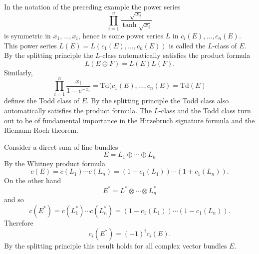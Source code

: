 \begin{example}\label{L-class and Todd class}
In the notation of the preceding example the power series
\[\prod_{i=1}^{n}\frac{\sqrt{x_i}}{\tanh\sqrt{x_i}}\]
is symmetric in $x_1,\dots,x_i$, hence is some power series $L$ in $c_i(E),\dots,c_n(E)$. This power series $L(E)=L(c_1(E),\dots,c_n(E))$ is called the $L$-class of $E$. 
By the splitting principle the $L$-class automatically satisfies the product formula
\[L(E\oplus F)=L(E)L(F).\]
Similarly,
\[\prod_{i=1}^{n}\frac{x_i}{1-e^{-x_i}}=\mathrm{Td}(c_1(E),\dots,c_n(E)=\mathrm{Td}(E)\]
defines the Todd class of $E$. By the splitting principle the Todd class also automatically satisfies the product formula. The $L$-class and the Todd class turn out to 
be of fundamental importance in the Hirzebruch signature formula and the Riemann-Roch theorem.
\end{example}
\begin{example}\label{Chern dual bundle}
Consider a direct sum of line bundles
\[E=L_1\oplus\cdots\oplus L_n\]
By the Whitney product formula
\[c(E)=c(L_1)\cdots c(L_n)=(1+c_1(L_1))\cdots(1+c_1(L_n)).\]
On the other hand
\[E^*=L^*\otimes\cdots\otimes L_n^*\]
and so
\[c(E^*)=c(L_1^*)\cdots c(L_n^*)=(1-c_1(L_1))\cdots(1-c_1(L_n)).\]
Therefore
\[c_i(E^*)=(-1)^ic_i(E).\]
By the splitting principle this result holds for all complex vector bundles $E$.
\end{example}
